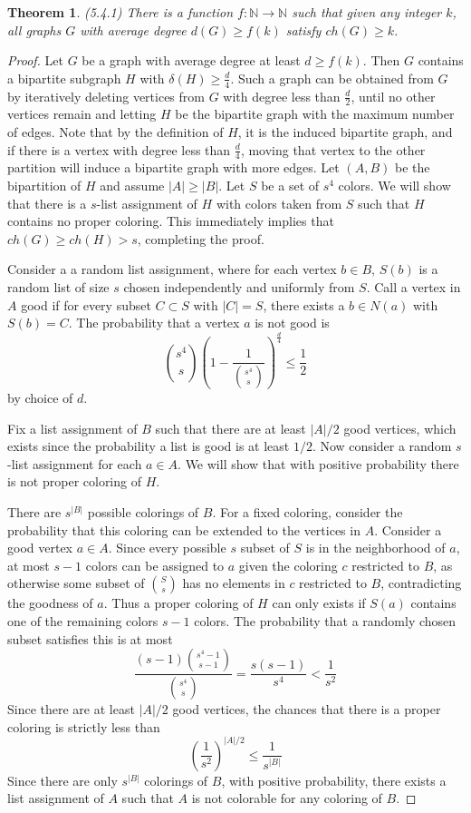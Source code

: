 \documentclass[12pt]{article}
\newtheorem{theorem}{Theorem}
\begin{document}
\begin{theorem} (5.4.1) There is a function
  $f:\mathbb{N} \to \mathbb{N}$ such that given any integer $k$, all
  graphs $G$ with average degree $d(G) \geq f(k)$ satisfy
  $ch(G) \geq k$.
\end{theorem}
\begin{proof} Let $G$ be a graph with average degree at least
  $d \geq f(k)$. Then $G$ contains a bipartite subgraph $H$ with
  $\delta(H) \geq \frac{d}{4}$. Such a graph can be obtained from $G$
  by iteratively deleting vertices from $G$ with degree less than
  $\frac{d}{2}$, until no other vertices remain and letting $H$ be the
  bipartite graph with the maximum number of edges. Note that by the
  definition of $H$, it is the induced bipartite graph, and if there
  is a vertex with degree less than $\frac{d}{4}$, moving that vertex
  to the other partition will induce a bipartite graph with more
  edges. Let $(A,B)$ be the bipartition of $H$ and assume
  $|A| \geq |B|$. Let $S$ be a set of $s^4$ colors. We will show that
  there is a $s$-list assignment of $H$ with colors taken from $S$
  such that $H$ contains no proper coloring. This immediately implies
  that $ch(G) \geq ch(H) > s$, completing the proof.

  Consider a a random list assignment, where for each vertex
  $b \in B$, $S(b)$ is a random list of size $s$ chosen independently
  and uniformly from $S$. Call a vertex in $A$ good if for every
  subset $C \subset S$ with $|C|=S$, there exists a $b \in N(a)$ with
  $S(b) = C$. The probability that a vertex $a$ is not good is
  \[
    {s^4 \choose s} {(1 - \dfrac{1}{{s^4 \choose s}})}^{\frac{d}{4}}
    \leq \dfrac{1}{2}
  \]
  by choice of $d$.

  Fix a list assignment of $B$ such that there are at least $|A|/2$
  good vertices, which exists since the probability a list is good is
  at least $1/2$. Now consider a random $s$-list assignment for each
  $a \in A$. We will show that with positive probability there is not
  proper coloring of $H$.

  There are $s^{|B|}$ possible colorings of $B$. For a fixed coloring,
  consider the probability that this coloring can be extended to the
  vertices in $A$. Consider a good vertex $a \in A$. Since every
  possible $s$ subset of $S$ is in the neighborhood of $a$, at most
  $s-1$ colors can be assigned to $a$ given the coloring $c$
  restricted to $B$, as otherwise some subset of ${S \choose s}$ has
  no elements in $c$ restricted to $B$, contradicting the goodness of
  $a$. Thus a proper coloring of $H$ can only exists if $S(a)$
  contains one of the remaining colors $s-1$ colors. The probability
  that a randomly chosen subset satisfies this is at most
  \[
    \dfrac{(s-1) {s^4 -1 \choose s-1}}{{s^4 \choose s}} =
    \dfrac{s(s-1)}{s^4} < \dfrac{1}{s^2}
  \]
  Since there are at least $|A|/2$ good vertices, the chances that
  there is a proper coloring is strictly less than
  \[
    {(\frac{1}{s^2})}^{|A|/2} \leq \dfrac{1}{s^{|B|}}
  \]
  Since there are only $s^{|B|}$ colorings of $B$, with positive
  probability, there exists a list assignment of $A$ such that $A$ is
  not colorable for any coloring of $B$.
\end{proof}
\end{document}
